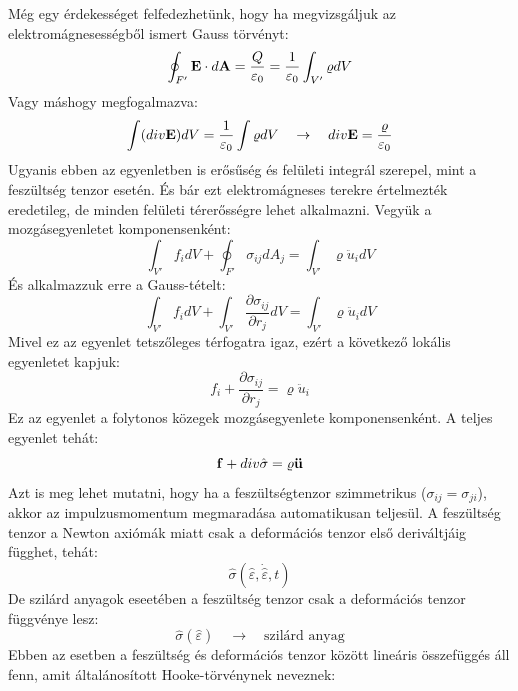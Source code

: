 \documentclass[../main.tex]{subfiles}
\begin{document}
Még egy érdekességet felfedezhetünk, hogy ha megvizsgáljuk az elektromágnesességből ismert Gauss törvényt:
\begin{equation}
    \oint_{F'} \bold{E} \cdot d\bold{A} = \frac{Q}{\varepsilon_0} = \frac{1}{\varepsilon_0} \int_{V'} \varrho dV
\end{equation}
Vagy máshogy megfogalmazva:
\begin{equation}
    \int (div \bold{E}) dV = \frac{1}{\varepsilon_0} \int \varrho dV \quad \rightarrow \quad div \bold{E} = \frac{\varrho}{\varepsilon_0}
\end{equation}
Ugyanis ebben az egyenletben is erősűség és felületi integrál szerepel, mint a feszültség tenzor esetén. És bár ezt elektromágneses terekre
értelmezték eredetileg, de minden felületi térerősségre lehet alkalmazni. Vegyük a mozgásegyenletet komponensenként:
\begin{equation}
    \int_{V'} f_i dV + \oint_{F'} \sigma_{ij} dA_j = \int_{V'} \varrho \ddot{u}_i dV
\end{equation}
És alkalmazzuk erre a Gauss-tételt:
\begin{equation}
    \int_{V'} f_i dV + \int_{V'} \frac{\partial \sigma_{ij}}{\partial r_j} dV = \int_{V'} \varrho \ddot{u}_i dV
\end{equation}
Mivel ez az egyenlet tetszőleges térfogatra igaz, ezért a következő lokális egyenletet kapjuk:
\begin{equation}
    f_i + \frac{\partial \sigma_{ij}}{\partial r_j} = \varrho \ddot{u}_i
\end{equation}
Ez az egyenlet a folytonos közegek mozgásegyenlete komponensenként. 
A teljes egyenlet tehát:
\begin{equation}
    \bold{f} + div \hat{\sigma} = \varrho \bold{\ddot{u}}
\end{equation}
Azt is meg lehet mutatni, hogy ha a feszültségtenzor szimmetrikus ($\sigma_{ij} = \sigma_{ji}$), akkor az impulzusmomentum megmaradása automatikusan teljesül.
A feszültség tenzor a Newton axiómák miatt csak a deformációs tenzor első deriváltjáig függhet, tehát: 
\begin{equation}
    \hat{\sigma}(\hat{\varepsilon}, \dot{\hat{\varepsilon}}, t)
\end{equation}
De szilárd anyagok eseetében a feszültség tenzor csak a deformációs tenzor függvénye lesz:
\begin{equation}
    \hat{\sigma}(\hat{\varepsilon}) \quad \rightarrow \quad \text{szilárd anyag}
\end{equation}
Ebben az esetben a feszültség és deformációs tenzor között lineáris összefüggés áll fenn, amit általánosított Hooke-törvénynek neveznek:
\end{document}
